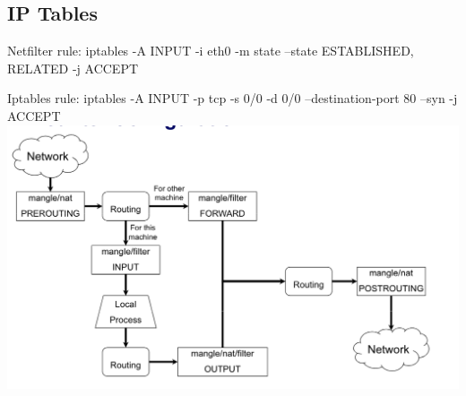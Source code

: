 \documentclass[english, leagacyboxes, nologo]{latex4ei/latex4ei_sheet}
\begin{document}
{  \subsection{IP Tables}
    Netfilter rule:
    iptables -A INPUT -i eth0 -m state --state ESTABLISHED, RELATED -j ACCEPT

    Iptables rule:  iptables -A INPUT -p tcp -s 0/0 -d 0/0 --destination-port 80 --syn -j ACCEPT
    \includegraphics[width=\columnwidth]{img/netfilter.png}
   }
\end{document}
